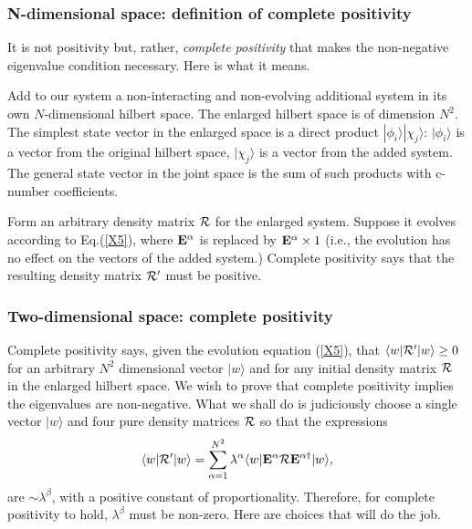 \documentclass[aps,pra,twocolumn,amssymb, amsfonts,amsmath,showpacs, superscriptaddress]{revtex4}
\begin{document}
\subsubsection{N-dimensional space: definition of complete positivity}

It is  not positivity but, rather, \textit{complete positivity} that makes the non-negative eigenvalue condition necessary. Here is what it means.

Add to our system a non-interacting and non-evolving additional system in its own $N$-dimensional hilbert space. The enlarged hilbert space is of dimension $N^{2}$. The simplest state vector in the enlarged space is a direct product $|\phi_{i}\rangle |\chi_{j}\rangle$: $|\phi_{i}\rangle$ is a vector from the original hilbert space, $|\chi_{j}\rangle$ is a vector from the added system.  The general state vector in the joint space is the sum of such products with c-number coefficients.  

Form an arbitrary density matrix ${ \cal R}$ for the enlarged system. Suppose it evolves according to Eq.(\ref{X5}), where ${\bf E}^{\alpha}$ is replaced by  ${\bf E}^{\alpha}\times1$ (i.e., the evolution has no effect on the vectors of the added system.) Complete positivity says that the resulting density matrix ${\cal R}'$ must be positive. 

\subsubsection{Two-dimensional space: complete positivity}

Complete positivity says, given the evolution equation (\ref{X5}), that $\langle w|{\cal R}'|w\rangle\geq0$ for an arbitrary $N^{2}$ dimensional vector $|w\rangle$  and for any initial density matrix ${\cal R}$ in the enlarged hilbert space.  We wish to prove  that complete positivity implies the eigenvalues are non-negative.  What we shall do is judiciously choose a single vector $|w\rangle$  and four pure density matrices ${\cal R}$ so that the expressions 
\[
 \langle w|{\cal R}'|w\rangle=\sum_{\alpha=1}^{N^{2}}\lambda^{\alpha}\langle w|{\bf E}^{\alpha}{\cal R}{\bf E}^{\alpha\dagger}|w\rangle,
\]
\noindent  are $\sim \lambda^{\beta}$, with a positive constant of proportionality. Therefore,  for complete positivity to hold, $ \lambda^{\beta}$ must be non-zero.  Here are choices that will do the job. 
\end{document}
